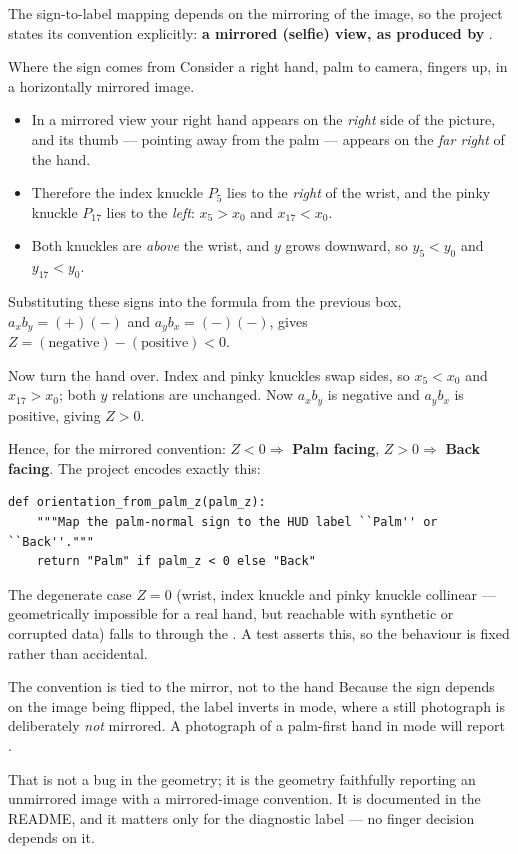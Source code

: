 The sign-to-label mapping depends on the mirroring of the image, so the project states its convention
explicitly: \textbf{a mirrored (selfie) view, as produced by }.

\begin{mathdeepdive}{Where the sign comes from}
Consider a right hand, palm to camera, fingers up, in a horizontally mirrored image.

\begin{itemize}
  \item In a mirrored view your right hand appears on the \emph{right} side of the picture, and its
        thumb --- pointing away from the palm --- appears on the \emph{far right} of the hand.
  \item Therefore the index knuckle $P_5$ lies to the \emph{right} of the wrist, and the pinky
        knuckle $P_{17}$ lies to the \emph{left}: $x_5 > x_0$ and $x_{17} < x_0$.
  \item Both knuckles are \emph{above} the wrist, and $y$ grows downward, so
        $y_5 < y_0$ and $y_{17} < y_0$.
\end{itemize}

Substituting these signs into the formula from the previous box,
$a_x b_y = (+)(-)$ and $a_y b_x = (-)(-)$, gives
$Z = (\text{negative}) - (\text{positive}) < 0$.

Now turn the hand over. Index and pinky knuckles swap sides, so $x_5 < x_0$ and $x_{17} > x_0$;
both $y$ relations are unchanged. Now $a_x b_y$ is negative and $a_y b_x$ is positive, giving
$Z > 0$.

Hence, for the mirrored convention: $Z<0 \Rightarrow$ \textbf{Palm facing}, $Z>0 \Rightarrow$
\textbf{Back facing}. The project encodes exactly this:

\begin{lstlisting}
def orientation_from_palm_z(palm_z):
    """Map the palm-normal sign to the HUD label ``Palm'' or ``Back''."""
    return "Palm" if palm_z < 0 else "Back"
\end{lstlisting}

The degenerate case $Z = 0$ (wrist, index knuckle and pinky knuckle collinear --- geometrically
impossible for a real hand, but reachable with synthetic or corrupted data) falls to 
through the . A test asserts this, so the behaviour is fixed rather than accidental.
\end{mathdeepdive}

\begin{edgetrap}{The convention is tied to the mirror, not to the hand}
Because the sign depends on the image being flipped, the label inverts in  mode, where
a still photograph is deliberately \emph{not} mirrored. A photograph of a palm-first hand in
 mode will report .

That is not a bug in the geometry; it is the geometry faithfully reporting an unmirrored image with a
mirrored-image convention. It is documented in the README, and it matters only for the diagnostic
label --- no finger decision depends on it.
\end{edgetrap}

